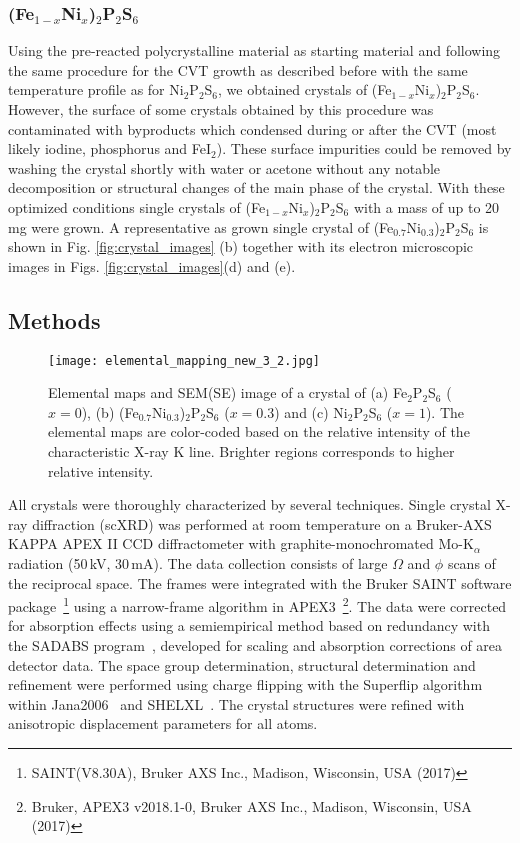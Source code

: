 \documentclass[twocolumn,superscriptaddress,prb,preprintnumbers,nobibnotes,aps]{revtex4-2}  %
\begin{document}
\subsubsection{(Fe$_{1-x}$Ni$_x$)$_2$P$_2$S$_6$}

Using the pre-reacted polycrystalline material as starting material and following the same procedure for the CVT growth as described before with the same temperature profile as for Ni$_2$P$_2$S$_6$, we obtained crystals of (Fe$_{1-x}$Ni$_x$)$_2$P$_2$S$_6$. However, the surface of some crystals obtained by this procedure was contaminated with byproducts which condensed during or after the CVT (most likely iodine, phosphorus and FeI$_2$). These surface impurities could be removed by washing the crystal shortly with water or acetone without any notable decomposition or structural changes of the main phase of the crystal. With these optimized conditions single crystals of (Fe$_{1-x}$Ni$_x$)$_2$P$_2$S$_6$ with a mass of up to 20\,mg were grown. A representative as grown single crystal of (Fe$_{0.7}$Ni$_{0.3}$)$_2$P$_2$S$_6$ is shown in Fig. \ref{fig:crystal_images} (b) together with its electron microscopic images in Figs. \ref{fig:crystal_images}(d) and (e).


\subsection{Methods}

\begin{figure*}[htb]
\texttt{[image: elemental\_mapping\_new\_3\_2.jpg]}
\caption{Elemental maps and SEM(SE) image of a crystal of (a) Fe$_2$P$_2$S$_6$ ($x = 0$), (b) (Fe$_{0.7}$Ni$_{0.3}$)$_2$P$_2$S$_6$ ($x = 0.3$) and (c) Ni$_2$P$_2$S$_6$ ($x = 1$). The elemental maps are color-coded based on the relative intensity of the characteristic X-ray K line. Brighter regions corresponds to higher relative intensity.}
\label{fig:elemental_mapping}
\end{figure*}

All crystals were thoroughly characterized by several techniques. Single crystal X-ray diffraction (scXRD) was performed at room temperature on a Bruker-AXS KAPPA APEX II CCD diffractometer with graphite-monochromated Mo-K$_\alpha$ radiation (50\,kV, 30\,mA). The data collection consists of large $\Omega$ and $\phi$ scans of the reciprocal space. The frames were integrated with the Bruker SAINT software package~\footnote{SAINT(V8.30A), Bruker AXS Inc., Madison, Wisconsin,
USA (2017)} using a narrow-frame algorithm in APEX3~\footnote{Bruker, APEX3 v2018.1-0, Bruker AXS Inc., Madison,
Wisconsin, USA (2017)}. The data were corrected for absorption effects using a semiempirical method based on redundancy with the SADABS program~\cite{Krause2015}, developed for scaling and absorption corrections of area detector data. The space group determination, structural determination and refinement were performed using charge flipping with the Superflip algorithm \cite{Palatinus2007} within Jana2006~\cite{Petricek2014} and SHELXL~\cite{Sheldrick2007}. The crystal structures were refined with anisotropic displacement parameters for all atoms.
\end{document}

